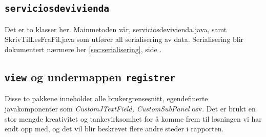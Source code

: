 \subsection*{\texttt{serviciosdevivienda}}
Det er to klasser her. Mainmetoden vår, serviciosdevivienda.java, samt SkrivTilLesFraFil.java som utfører all serialisering av data. Serialisering blir dokumentert nærmere her \ref{sec:serialisering}, side \pageref{sec:serialisering}.

\subsection*{\texttt{view} og undermappen \texttt{registrer}}
Disse to pakkene inneholder alle brukergrensesnitt, egendefinerte javakomponenter som \emph{CustomJTextField, CustomSubPanel} osv.
Det er brukt en stor mengde kreativitet og tankevirksomhet for å komme frem til løsningen vi har endt opp med, og det vil blir beskrevet flere andre steder i rapporten.


